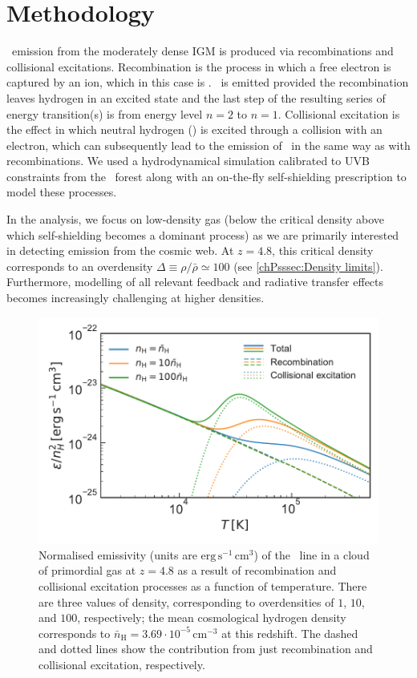 \section{Methodology}
\label{chPsec:Methodology}

\lya\ emission from the moderately dense IGM is produced via recombinations and collisional excitations. Recombination is the process in which a free electron is captured by an ion, which in this case is . \lya\ is emitted provided the recombination leaves hydrogen in an excited state and the last step of the resulting series of energy transition(s) is from energy level $n=2$ to $n=1$. Collisional excitation is the effect in which neutral hydrogen () is excited through a collision with an electron, which can subsequently lead to the emission of \lya\ in the same way as with recombinations. We used a hydrodynamical simulation calibrated to UVB constraints from the \lya\ forest along with an on-the-fly self-shielding prescription to model these processes.

In the analysis, we focus on low-density gas (below the critical density above which self-shielding becomes a dominant process) as we are primarily interested in detecting emission from the cosmic web. At $z=4.8$, this critical density corresponds to an overdensity $\Delta \equiv \rho/\bar{\rho} \simeq 100$ (see \cref{chPsssec:Density limits}). Furthermore, modelling of all relevant feedback and radiative transfer effects becomes increasingly challenging at higher densities.
\begin{figure}
    \centering
    \includegraphics[width=0.6\linewidth]{"Plots/ChapterP/Theoretical_emissivity"}
    \caption[Theoretical \lya\ emissivity as a function of temperature.]
    {Normalised emissivity (units are $\mathrm{erg \, s^{-1} \, cm^3}$) of the \lya\ line in a cloud of primordial gas at $z=4.8$ as a result of recombination and collisional excitation processes as a function of temperature. There are three values of density, corresponding to overdensities of $1$, $10$, and $100$, respectively; the mean cosmological hydrogen density corresponds to $\bar{n}_\text{H} = 3.69 \cdot 10^{-5} \, \mathrm{cm^{-3}}$ at this redshift. The dashed and dotted lines show the contribution from just recombination and collisional excitation, respectively.}
    \label{chPfig:Emissivity theoretical}
\end{figure}

